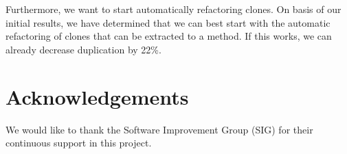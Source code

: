 \documentclass[a4paper]{article}
\begin{document}
Furthermore, we want to start automatically refactoring clones. On basis of our initial results, we have determined that we can best start with the automatic refactoring of clones that can be extracted to a method. If this works, we can already decrease duplication by 22\%.

\section*{Acknowledgements}
We would like to thank the Software Improvement Group (SIG) for their continuous support in this project.



\end{document}
